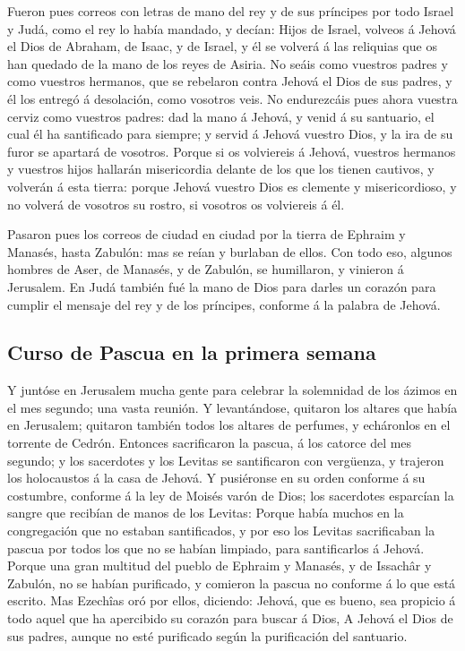  Fueron pues correos con letras de mano del rey y de sus
príncipes por todo Israel y Judá, como el rey lo había mandado, y
decían: Hijos de Israel, volveos á Jehová el Dios de Abraham, de Isaac,
y de Israel, y él se volverá á las reliquias que os han quedado de la
mano de los reyes de Asiria.  No seáis como vuestros padres
y como vuestros hermanos, que se rebelaron contra Jehová el Dios de sus
padres, y él los entregó á desolación, como vosotros veis. 
No endurezcáis pues ahora vuestra cerviz como vuestros padres: dad la
mano á Jehová, y venid á su santuario, el cual él ha santificado para
siempre; y servid á Jehová vuestro Dios, y la ira de su furor se
apartará de vosotros.  Porque si os volviereis á Jehová,
vuestros hermanos y vuestros hijos hallarán misericordia delante de los
que los tienen cautivos, y volverán á esta tierra: porque Jehová vuestro
Dios es clemente y misericordioso, y no volverá de vosotros su rostro,
si vosotros os volviereis á él.

 Pasaron pues los correos de ciudad en ciudad por la tierra
de Ephraim y Manasés, hasta Zabulón: mas se reían y burlaban de ellos.
 Con todo eso, algunos hombres de Aser, de Manasés, y de
Zabulón, se humillaron, y vinieron á Jerusalem.  En Judá
también fué la mano de Dios para darles un corazón para cumplir el
mensaje del rey y de los príncipes, conforme á la palabra de Jehová.

\hypertarget{curso-de-pascua-en-la-primera-semana}{%
\subsection{Curso de Pascua en la primera
semana}\label{curso-de-pascua-en-la-primera-semana}}

 Y juntóse en Jerusalem mucha gente para celebrar la
solemnidad de los ázimos en el mes segundo; una vasta reunión.
 Y levantándose, quitaron los altares que había en
Jerusalem; quitaron también todos los altares de perfumes, y echáronlos
en el torrente de Cedrón.  Entonces sacrificaron la pascua,
á los catorce del mes segundo; y los sacerdotes y los Levitas se
santificaron con vergüenza, y trajeron los holocaustos á la casa de
Jehová.  Y pusiéronse en su orden conforme á su costumbre,
conforme á la ley de Moisés varón de Dios; los sacerdotes esparcían la
sangre que recibían de manos de los Levitas:  Porque había
muchos en la congregación que no estaban santificados, y por eso los
Levitas sacrificaban la pascua por todos los que no se habían limpiado,
para santificarlos á Jehová.  Porque una gran multitud del
pueblo de Ephraim y Manasés, y de Issachâr y Zabulón, no se habían
purificado, y comieron la pascua no conforme á lo que está escrito. Mas
Ezechîas oró por ellos, diciendo: Jehová, que es bueno, sea propicio á
todo aquel que ha apercibido su corazón para buscar á Dios,
 A Jehová el Dios de sus padres, aunque no esté purificado
según la purificación del santuario.

